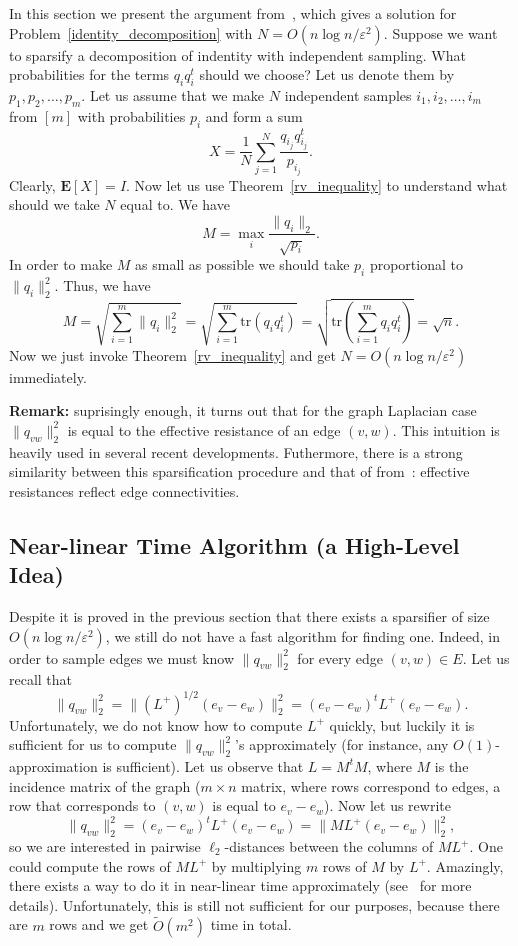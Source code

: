 \documentclass[12pt]{article}
\newcommand{\eps}{\varepsilon}
\begin{document}
    In this section we present the argument from~\cite{SS11}, which gives a solution
    for Problem~\ref{identity_decomposition} with $N = O(n \log n / \eps^2)$.
    Suppose we want to sparsify a decomposition of indentity with independent sampling.
    What probabilities for the terms $q_i q_i^t$ should we choose?
    Let us denote them by $p_1, p_2, \ldots, p_m$.
    Let us assume that we make $N$ independent samples $i_1, i_2, \ldots, i_m$
    from $[m]$ with probabilities $p_i$ and form a sum
    $$
        X = \frac{1}{N} \sum_{j=1}^N \frac{q_{i_j} q_{i_j}^t}{p_{i_j}}.
    $$
    Clearly, $\mathbf{E}[X] = I$. Now let us use Theorem~\ref{rv_inequality} to understand
    what should we take $N$ equal to. We have
    $$
        M = \max_i \frac{\|q_i\|_2}{\sqrt{p_i}}.
    $$
    In order to make $M$ as small as possible we should take $p_i$ proportional to
    $\|q_i\|_2^2$. Thus, we have
    $$
        M = \sqrt{\sum_{i=1}^m \|q_i\|_2^2} =
        \sqrt{\sum_{i=1}^m \mathrm{tr}(q_i q_i^t)} =
        \sqrt{\mathrm{tr}\left(\sum_{i=1}^m q_i q_i^t\right)} = \sqrt{n}.
    $$
    Now we just invoke Theorem~\ref{rv_inequality} and get $N = O(n \log n / \eps^2)$
    immediately.

    \textbf{Remark:} suprisingly enough, it turns out that for the graph Laplacian case
    $\|q_{vw}\|_2^2$ is equal to the effective resistance of an edge $(v, w)$.
    This intuition is heavily used in several recent developments. Futhermore, there is a strong similarity between this
    sparsification procedure and that of from~\cite{BK96}: effective resistances reflect edge connectivities.

    \subsection{Near-linear Time Algorithm (a High-Level Idea)}

    Despite it is proved in the previous section that there exists a sparsifier of size
    $O(n \log n / \eps^2)$, we still do not have a fast algorithm for finding one.
    Indeed, in order to sample edges we must know $\|q_{vw}\|_2^2$ for every edge
    $(v, w) \in E$. Let us recall that
    $$
        \|q_{vw}\|_2^2 = \|(L^+)^{1/2} (e_v - e_w)\|_2^2 =
        (e_v - e_w)^t L^+ (e_v - e_w).
    $$
    Unfortunately, we do not know how to compute $L^+$ quickly, but luckily it is sufficient
    for us to compute $\|q_{vw}\|_2^2$'s approximately (for instance, any
    $O(1)$-approximation is sufficient).
    Let us observe that $L = M^t M$, where $M$ is the incidence matrix of the graph
    ($m \times n$ matrix, where rows correspond to edges, a row that corresponds to
    $(v, w)$ is equal to $e_v - e_w$). Now let us rewrite
    $$
        \|q_{vw}\|_2^2 = (e_v - e_w)^t L^+ (e_v - e_w) =
        \|ML^+(e_v - e_w)\|_2^2,
    $$
    so we are interested in pairwise $\ell_2$-distances between the columns of $ML^+$.
    One could compute the rows of $ML^+$ by multiplying $m$ rows of $M$ by $L^+$.
    Amazingly, there exists a way to do it in near-linear time approximately
    (see~\cite{KMP10} for more details). Unfortunately, this is still not sufficient
    for our purposes, because there are $m$ rows and we get $\tilde{O}(m^2)$ time in total.
\end{document}

